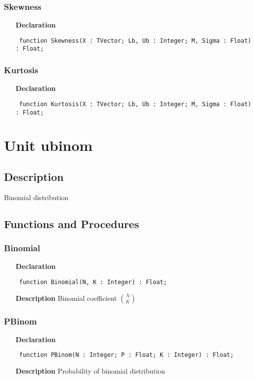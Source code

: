 \documentclass[12pt,a4paper,oneside]{report}
\newcommand{\declarationitem}[1]{\textbf{#1}}
\newcommand{\descriptiontitle}[1]{\textbf{#1}}
\newcommand{\code}[1]{\texttt{#1}}
\begin{document}
\subsubsection{Skewness}
\label{uskew-Skewness}
\begin{itemize}\item[\declarationitem{Declaration}\hfill]
	\begin{flushleft}
		\code{
			function Skewness(X : TVector; Lb, Ub : Integer; M, Sigma : Float) : Float;}
	\end{flushleft}
\end{itemize}
\subsubsection{Kurtosis}
\label{uskew-Kurtosis}
\begin{itemize}\item[\declarationitem{Declaration}\hfill]
	\begin{flushleft}
		\code{
			function Kurtosis(X : TVector; Lb, Ub : Integer; M, Sigma : Float) : Float;}
	\end{flushleft}
\end{itemize}
\section{Unit ubinom}
\label{ubinom}
\subsection{Description}
Binomial distribution 
\subsection{Functions and Procedures}
\subsubsection{Binomial}
\label{ubinom-Binomial}
\begin{itemize}\item[\declarationitem{Declaration}\hfill]
	\begin{flushleft}
		\code{
			function Binomial(N, K : Integer) : Float;}
	\end{flushleft}
	\item[\descriptiontitle{Description}]
	Binomial coefficient $\binom{N}{K}$
\end{itemize}
\subsubsection{PBinom}
\label{ubinom-PBinom}
\begin{itemize}\item[\declarationitem{Declaration}\hfill]
	\begin{flushleft}
		\code{
			function PBinom(N : Integer; P : Float; K : Integer) : Float;}
	\end{flushleft}
	\item[\descriptiontitle{Description}]
	Probability of binomial distribution
\end{itemize}
\end{document}
